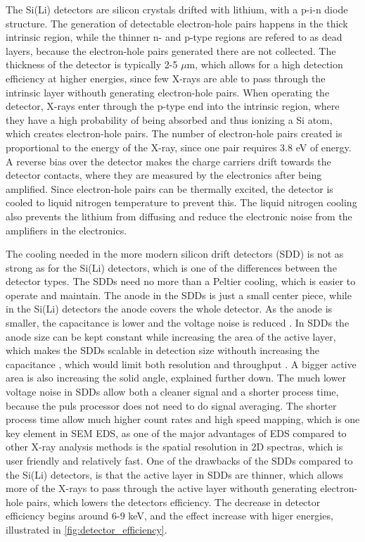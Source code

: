 The Si(Li) detectors are silicon crystals drifted with lithium, with a p-i-n diode structure.
The generation of detectable electron-hole pairs happens in the thick intrinsic region, while the thinner n- and p-type regions are refered to as dead layers, because the electron-hole pairs generated there are not collected.
The thickness of the detector is typically 2-5 $\mu$m, which allows for a high detection efficiency at higher energies, since few X-rays are able to pass through the intrinsic layer withouth generating electron-hole pairs.
When operating the detector, X-rays enter through the p-type end into the intrinsic region, where they have a high probability of being absorbed and thus ionizing a Si atom, which creates electron-hole pairs.
The number of electron-hole pairs created is proportional to the energy of the X-ray, since one pair requires 3.8 eV of energy.
A reverse bias over the detector makes the charge carriers drift towards the detector contacts, where they are measured by the electronics after being amplified.
Since electron-hole pairs can be thermally excited, the detector is cooled to liquid nitrogen temperature to prevent this.
The liquid nitrogen cooling also prevents the lithium from diffusing and reduce the electronic noise from the amplifiers in the electronics.


The cooling needed in the more modern silicon drift detectors (SDD) is not as strong as for the Si(Li) detectors, which is one of the differences between the detector types.
The SDDs need no more than a Peltier cooling, which is easier to operate and maintain.
The anode in the SDDs is just a small center piece, while in the Si(Li) detectors the anode covers the whole detector.
As the anode is smaller, the capacitance is lower and the voltage noise is reduced .
In SDDs the anode size can be kept constant while increasing the area of the active layer, which makes the SDDs scalable in detection size withouth increasing the capacitance , which would limit both resolution and throughput \cite[Ch. 16.3.9]{goldstein_scanning_2018}.
A bigger active area is also increasing the solid angle, explained further down.
The much lower voltage noise in SDDs allow both a cleaner signal and a shorter process time, because the puls processor does not need to do signal averaging.
The shorter process time allow much higher count rates and high speed mapping, which is one key element in SEM EDS, as one of the major advantages of EDS compared to other X-ray analysis methods is the spatial resolution in 2D spectras, which is user friendly and relatively fast.
One of the drawbacks of the SDDs compared to the Si(Li) detectors, is that the active layer in SDDs are thinner, which allows more of the X-rays to pass through the active layer withouth generating electron-hole pairs, which lowers the detectors efficiency.
The decrease in detector efficiency begins around 6-9 keV, and the effect increase with higer energies, illustrated in \cref{fig:detector_efficiency}.


